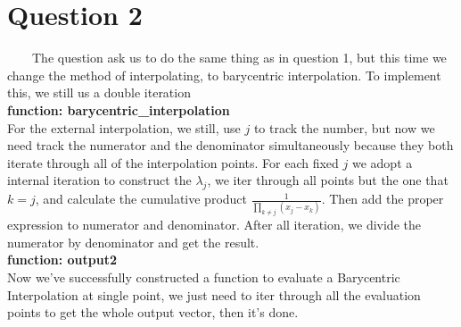 \documentclass[a4paper]{article}
\begin{document}
\section{Question 2}
~~~~The question ask us to do the same thing as in question 1, but this time we change the method of interpolating, to barycentric interpolation. To implement this, we still us a double iteration\\
\textbf{function: barycentric\_interpolation}\\
\indent For the external interpolation, we still, use $j$ to track the number, but now we need track the numerator and the denominator simultaneously because they both iterate through all of the interpolation points. For each fixed $j$ we adopt a internal iteration to construct the $\lambda_j$, we iter through all points but the one that $k=j$, and calculate the cumulative product $\frac{1}{\prod_{k\neq j}(x_j-x_k)}$. Then add the proper expression to numerator and denominator. After all iteration, we divide the numerator by denominator and get the result.\\
\textbf{function: output2}\\
\indent Now we've successfully constructed a function to evaluate a Barycentric Interpolation at single point, we just need to iter through all the evaluation points to get the whole output vector, then it's done.
\end{document}
